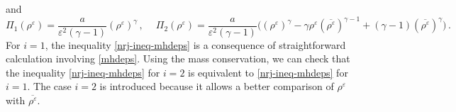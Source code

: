 \documentclass[11pt,reqno]{amsart}
\begin{document}
and
\begin{equation}
\label{defPI-P}
\Pi_1(\rho^\varepsilon)=\frac{a}{\varepsilon^2(\gamma-1)}(\rho^\varepsilon)^\gamma\,, \quad \
\Pi_2(\rho^\varepsilon)=\frac{a}{\varepsilon^2(\gamma-1)}\big( (\rho^\varepsilon)^\gamma
- \gamma \rho^\varepsilon (\overline{\rho^\varepsilon})^{\gamma -1} +(\gamma -1)(\overline{\rho^\varepsilon})^{\gamma}
\big)\,.
\end{equation}
For $ i=1 $, the inequality \eqref{nrj-ineq-mhdeps} is a consequence of straightforward calculation involving  \eqref{mhdeps}. Using the mass conservation, we can check that the inequality \eqref{nrj-ineq-mhdeps} for $ i= 2 $ is equivalent to \eqref{nrj-ineq-mhdeps} for $ i= 1 $. The case $ i= 2 $ is introduced because it allows a better comparison of $ \rho^\varepsilon $ with $ \overline{\rho^\varepsilon} $.
\end{document}
